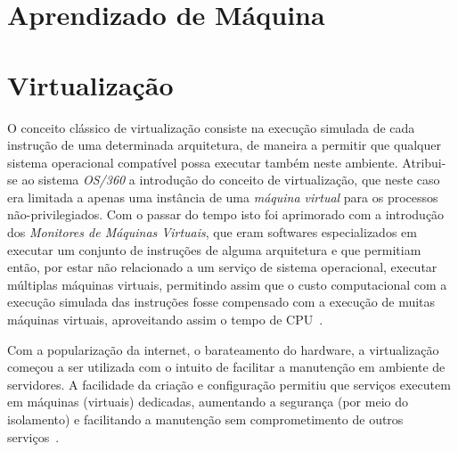 %
%

\chapter{Aprendizado de Máquina}\label{sec:aprendizado}



\chapter{Virtualização}\label{sec:virt}

O conceito clássico de virtualização consiste na execução simulada de cada
instrução de uma determinada arquitetura, de maneira a permitir que
qualquer sistema operacional compatível possa executar também neste
ambiente.  Atribui-se ao sistema \emph{OS/360} a introdução do conceito de
virtualização, que neste caso era limitada a apenas uma instância de uma
\emph{máquina virtual} para os processos não-privilegiados. Com o passar do
tempo isto foi aprimorado com a introdução dos \emph{Monitores de Máquinas
Virtuais}, que eram softwares especializados em executar um conjunto de
instruções de alguma arquitetura e que permitiam então, por estar não
relacionado a um serviço de sistema operacional, executar múltiplas
máquinas virtuais, permitindo assim que o custo computacional com a
execução simulada das instruções fosse compensado com a execução de muitas
máquinas virtuais, aproveitando assim o tempo de
CPU~\cite{goldberg1974survey}.

Com a popularização da internet, o barateamento do hardware, a
virtualização começou a ser utilizada com o intuito de facilitar a
manutenção em ambiente de servidores. A facilidade da criação e
configuração permitiu que serviços executem em máquinas (virtuais)
dedicadas, aumentando a segurança (por meio do isolamento) e facilitando a
manutenção sem comprometimento de outros serviços~\cite{peter2005resource}.



\section{\libvirt}\label{sec:libvirt}


